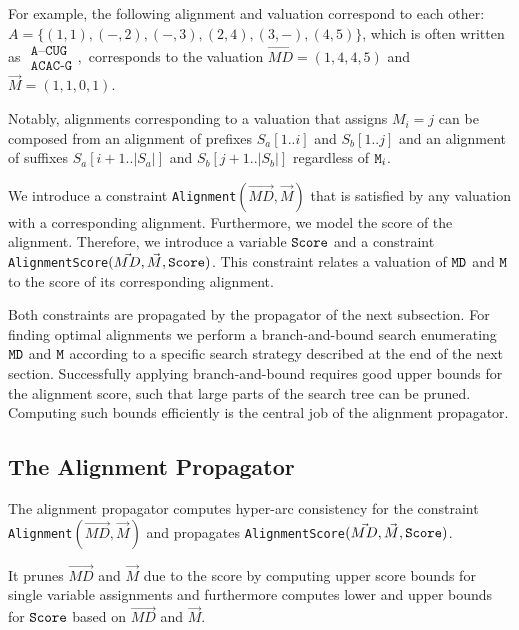 \documentclass[11pt]{llncs}
\begin{document}
For example, the following alignment and valuation correspond to each
other: $A=\{(1,1),(-,2),(-,3),(2,4),(3,-),(4,5)\}$, which is often written as
$\begin{array}{c}
\texttt{A--CUG}\\
\texttt{ACAC-G}
\end{array},$
corresponds to the valuation $\vec{MD}=(1,4,4,5)$ and $\vec{M}=(1,1,0,1)$.

Notably, alignments corresponding to a valuation that assigns $M_i=j$
can be composed from an alignment of prefixes $S_a[1..i]$ and
$S_b[1..j]$ and an alignment of suffixes $S_a[i+1..|S_a|]$ and $S_b[j+1..|S_b|]$
regardless of $\texttt{M}_i$.

We introduce a constraint \texttt{Alignment}$(\vec{MD},\vec{M})$ that
is satisfied by any valuation with a corresponding alignment.
Furthermore, we model the score of the alignment. Therefore, we
introduce a variable $\texttt{Score}$ and a constraint
\texttt{AlignmentScore}$(\vec{MD},\vec{M},\texttt{Score})$. This
constraint relates a valuation of $\texttt{MD}$ and $\texttt{M}$ to the
score of its corresponding alignment.

Both constraints are propagated by the propagator of the next
subsection. For finding optimal alignments we perform a
branch-and-bound search enumerating $\texttt{MD}$ and $\texttt{M}$ according
to a specific search strategy described at the end of the next
section. Successfully applying branch-and-bound requires good upper
bounds for the alignment score, such that large parts of the search
tree can be pruned. Computing such bounds efficiently is the central
job of the alignment propagator.

\subsection{The Alignment Propagator}

The alignment propagator computes hyper-arc consistency for the constraint
\texttt{Alignment}$(\vec{MD},\vec{M})$ and propagates
\texttt{AlignmentScore}$(\vec{MD},\vec{M},\texttt{Score})$.

It prunes $\vec{MD}$ and $\vec{M}$ due to the score by computing upper
score bounds for single variable assignments and furthermore computes
lower and upper bounds for $\texttt{Score}$ based on $\vec{MD}$ and
$\vec{M}$.
\end{document}
